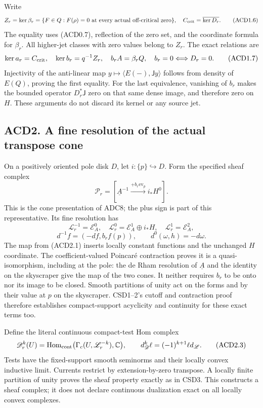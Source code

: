 Write \[
Z_r=\ker\beta_r
=\{F\in Q:F(\rho)=0\text{ at every actual off-critical zero}\},
\quad C_{\rm crit}=\overline{\ker D_r}.
\tag{ACD1.6}
\] The equality uses (ACD0.7), reflection of the zero set, and the
coordinate formula for \(\beta_r\). All higher-jet classes with zero
values belong to \(Z_r\). The exact relations are \[
\ker a_r=C_{\rm crit},\quad \ker b_r=q^{-1}Z_r,\quad
b_rA=\beta_rQ,\quad b_r=0\Longleftrightarrow D_r=0.
\tag{ACD1.7}
\] Injectivity of the anti-linear map
\(y\mapsto\langle E(-),\mathsf Jy\rangle\) follows from density of
\(E(Q)\), proving the first equality. For the last equivalence,
vanishing of \(b_r\) makes the bounded operator \(D_r^*\mathsf J\) zero
on that same dense image, and therefore zero on \(H\). These arguments
do not discard its kernel or any source jet.

\subsection{ACD2. A fine resolution of the actual transpose
cone}\label{acd2.-a-fine-resolution-of-the-actual-transpose-cone}

On a positively oriented pole disk \(D\), let
\(i:\{p\}\hookrightarrow D\). Form the specified sheaf complex \[
\mathscr P_r=[\underline A^{-1}\xrightarrow{+b_r\mathrm{ev}_p}i_*H^0].
\tag{ACD2.1}
\] This is the cone presentation of ADC8; the plus sign is part of this
representative. Its fine resolution has \[
\mathscr L_r^{-1}=\mathscr E_A^0,\quad
\mathscr L_r^0=\mathscr E_A^1\oplus i_*H,\quad
\mathscr L_r^1=\mathscr E_A^2,
\] \[
d^{-1}f=(-df,b_rf(p)),\qquad d^0(\omega,h)=-d\omega.
\tag{ACD2.2}
\] The map from (ACD2.1) inserts locally constant functions and the
unchanged \(H\) coordinate. The coefficient-valued Poincaré contraction
proves it is a quasi-isomorphism, including at the pole: the de Rham
resolution of \(\underline A\) and the identity on the skyscraper give
the map of the two cones. It neither requires \(b_r\) to be onto nor its
image to be closed. Smooth partitions of unity act on the forms and by
their value at \(p\) on the skyscraper. CSD1--2's cutoff and contraction
proof therefore establishes compact-support acyclicity and continuity
for these exact terms too.

Define the literal continuous compact-test Hom complex \[
\mathscr D_r^k(U)=\operatorname{Hom}_{\rm cont}
\bigl(\Gamma_c(U,\mathscr L_r^{-k}),\mathbb C\bigr),\qquad
d_{\mathscr D}^k\ell=(-1)^{k+1}\ell d_{\mathscr L}.
\tag{ACD2.3}
\] Tests have the fixed-support smooth seminorms and their locally
convex inductive limit. Currents restrict by extension-by-zero
transpose. A locally finite partition of unity proves the sheaf property
exactly as in CSD3. This constructs a sheaf complex; it does not declare
continuous dualization exact on all locally convex complexes.

